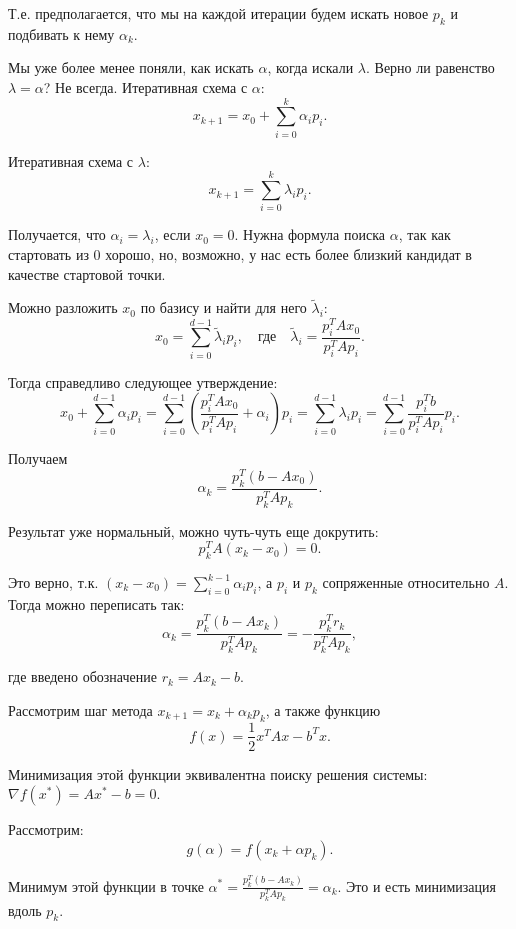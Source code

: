 Т.е. предполагается, что мы на каждой итерации будем искать новое $p_k$ и подбивать к нему $\alpha_k$.

Мы уже более менее поняли, как искать $\alpha$, когда искали $\lambda$. Верно ли равенство $\lambda = \alpha$? Не всегда. Итеративная схема с $\alpha$:
$$ x_{k+1} = x_0 + \sum_{i=0}^{k} \alpha_i p_i. $$

Итеративная схема с $\lambda$:
$$ x_{k+1} = \sum_{i=0}^{k} \lambda_i p_i. $$

Получается, что $\alpha_i = \lambda_i$, если $x_0 = 0$. Нужна формула поиска $\alpha$, так как стартовать из 0 хорошо, но, возможно, у нас есть более близкий кандидат в качестве стартовой точки.

Можно разложить $x_0$ по базису и найти для него $\tilde{\lambda}_i$:
$$ x_0 = \sum_{i=0}^{d-1} \tilde{\lambda}_i p_i, \quad \text{где} \quad \tilde{\lambda}_i = \frac{p_i^T A x_0}{p_i^T A p_i}. $$

Тогда справедливо следующее утверждение:
$$ x_0 + \sum_{i=0}^{d-1} \alpha_i p_i = \sum_{i=0}^{d-1} \left( \frac{p_i^T A x_0}{p_i^T A p_i} + \alpha_i \right) p_i = \sum_{i=0}^{d-1} \lambda_i p_i = \sum_{i=0}^{d-1} \frac{p_i^T b}{p_i^T A p_i} p_i. $$

Получаем
$$ \alpha_k = \frac{p_k^T (b - A x_0)}{p_k^T A p_k}. $$

Результат уже нормальный, можно чуть-чуть еще докрутить:
$$ p_k^T A (x_k - x_0) = 0. $$

Это верно, т.к. $(x_k - x_0) = \sum_{i=0}^{k-1} \alpha_i p_i$, а $p_i$ и $p_k$ сопряженные относительно $A$. Тогда можно переписать так:
$$ \alpha_k = \frac{p_k^T (b - A x_k)}{p_k^T A p_k} = -\frac{p_k^T r_k}{p_k^T A p_k}, $$

где введено обозначение $r_k = A x_k - b$.

Рассмотрим шаг метода $x_{k+1} = x_k + \alpha_k p_k$, а также функцию
$$ f(x) = \frac{1}{2} x^T A x - b^T x. $$

Минимизация этой функции эквивалентна поиску решения системы: $\nabla f(x^*) = A x^* - b = 0$.

Рассмотрим:
$$ g(\alpha) = f(x_k + \alpha p_k). $$

Минимум этой функции в точке $\alpha^* = \frac{p_k^T (b - A x_k)}{p_k^T A p_k} = \alpha_k$. Это и есть минимизация вдоль $p_k$.

